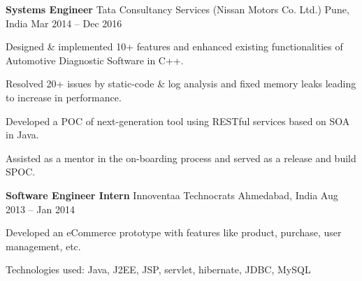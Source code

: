 \documentclass[]{awesome-cv}
\begin{document}
\vspace{-7mm}
\begin{cventries}
	\cventry
	{\textbf{Systems Engineer}}
	{Tata Consultancy Services (Nissan Motors Co. Ltd.)}
	{Pune, India}
	{Mar 2014 – Dec 2016}
	{
	\vspace{1mm}
	\begin{cvresponsiblties}
		\item {Designed \& implemented 10+ features and enhanced existing functionalities of Automotive Diagnostic Software in C++.}
		\item {Resolved 20+ issues by static-code \& log analysis and fixed memory leaks leading to increase in performance.}
		\item {Developed a POC of next-generation tool using RESTful services based on SOA in Java.}
		\item {Assisted as a mentor in the on-boarding process and served as a release and build SPOC.}
	\end{cvresponsiblties}
	\vspace{-2mm}
	}
	\cventry
	{\textbf{Software Engineer Intern}}
	{Innoventaa Technocrats}
	{Ahmedabad, India}
	{Aug 2013 – Jan 2014}
	{
	\vspace{1mm}
	\begin{cvresponsiblties}
		\item {Developed an eCommerce prototype with features like product, purchase, user management, etc.}
		\item {Technologies used: Java, J2EE, JSP, servlet, hibernate, JDBC, MySQL}
		\end{cvresponsiblties}
	}
\end{cventries}
\vspace{-5.5mm}
\vspace{-4mm}
\end{document}
